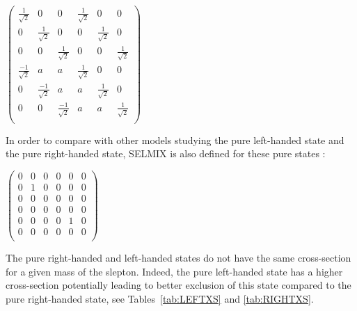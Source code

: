 \documentclass{cernatlasnote}
\begin{document}
\begin{center}
     $\begin{pmatrix}
  \frac{1}{\sqrt{2}} & 0 & 0 & \frac{1}{\sqrt{2}} & 0 & 0 \\ 
  0 & \frac{1}{\sqrt{2}} & 0 & 0 & \frac{1}{\sqrt{2}} & 0  \\
  0 & 0 & \frac{1}{\sqrt{2}} & 0 & 0 & \frac{1}{\sqrt{2}} \\
  \frac{-1}{\sqrt{2}} & a & a & \frac{1}{\sqrt{2}} & 0 & 0  \\
  0 & \frac{-1}{\sqrt{2}} & a & a & \frac{1}{\sqrt{2}} & 0  \\
  0 & 0 & \frac{-1}{\sqrt{2}} & a & a & \frac{1}{\sqrt{2}}  \\
\end{pmatrix}$
\end{center}

In order to compare with other models studying the pure left-handed state and the pure right-handed state, SELMIX is also defined for these pure states :

\begin{center}
     $\begin{pmatrix}
  0 & 0 & 0 & 0 & 0 & 0 \\ 
  0 & 1 & 0 & 0 & 0 & 0  \\
  0 & 0 & 0 & 0 & 0 & 0  \\
  0 & 0 & 0 & 0 & 0 & 0  \\
  0 & 0 & 0 & 0 & 1 & 0  \\
  0 & 0 & 0 & 0 & 0 & 0  \\
\end{pmatrix}$
\end{center}
 The pure right-handed and left-handed states do not have the same cross-section for a given mass of the slepton. Indeed, the pure left-handed state has a higher cross-section potentially leading to better exclusion of this state compared to the pure right-handed state, see Tables~\ref{tab:LEFTXS} and \ref{tab:RIGHTXS}. 
\end{document}
